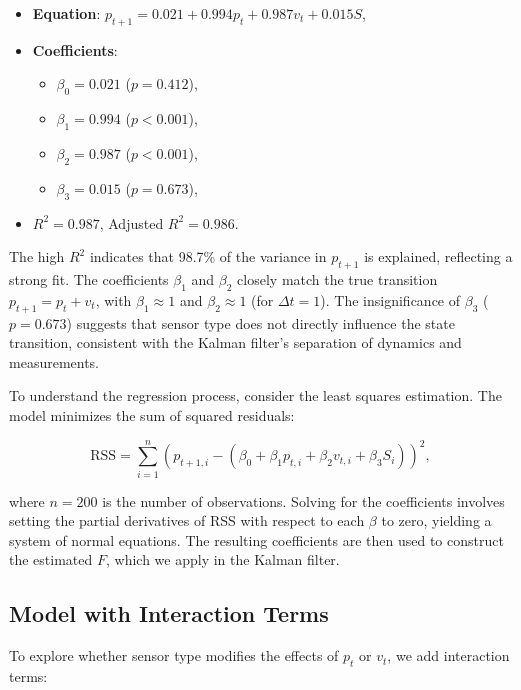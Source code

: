 \documentclass[12pt]{article}
\begin{document}
\begin{itemize}
    \item \textbf{Equation}: \( p_{t+1} = 0.021 + 0.994 p_t + 0.987 v_t + 0.015 S \),
    \item \textbf{Coefficients}:
    \begin{itemize}
        \item \( \beta_0 = 0.021 \) (\( p = 0.412 \)),
        \item \( \beta_1 = 0.994 \) (\( p < 0.001 \)),
        \item \( \beta_2 = 0.987 \) (\( p < 0.001 \)),
        \item \( \beta_3 = 0.015 \) (\( p = 0.673 \)),
    \end{itemize}
    \item \( R^2 = 0.987 \), Adjusted \( R^2 = 0.986 \).
\end{itemize}

The high \( R^2 \) indicates that 98.7\% of the variance in \( p_{t+1} \) is explained, reflecting a strong fit. The coefficients \( \beta_1 \) and \( \beta_2 \) closely match the true transition \( p_{t+1} = p_t + v_t \), with \( \beta_1 \approx 1 \) and \( \beta_2 \approx 1 \) (for \( \Delta t = 1 \)). The insignificance of \( \beta_3 \) (\( p = 0.673 \)) suggests that sensor type does not directly influence the state transition, consistent with the Kalman filter’s separation of dynamics and measurements.

To understand the regression process, consider the least squares estimation. The model minimizes the sum of squared residuals:

\begin{equation}
    \text{RSS} = \sum_{i=1}^n (p_{t+1,i} - (\beta_0 + \beta_1 p_{t,i} + \beta_2 v_{t,i} + \beta_3 S_i))^2,
    \label{eq:rss}
\end{equation}

where \( n = 200 \) is the number of observations. Solving for the coefficients involves setting the partial derivatives of RSS with respect to each \( \beta \) to zero, yielding a system of normal equations. The resulting coefficients are then used to construct the estimated \( F \), which we apply in the Kalman filter.

\subsection{Model with Interaction Terms}
\label{subsec:interaction}

To explore whether sensor type modifies the effects of \( p_t \) or \( v_t \), we add interaction terms:
\end{document}
